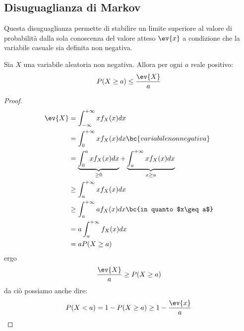 \subsection{Disuguaglianza di Markov}
Questa disuguaglianza permette di stabilire un limite superiore al valore di probabilità dalla sola conoscenza del valore atteso $\ev{x}$ a condizione che la variabile casuale sia definita non negativa.
\begin{teor} \label{teor:markov}
	Sia $X$ una variabile aleatoria non negativa. Allora per ogni $a$ reale positivo:
	\begin{equation*}
		P(X\geq a) \leq \frac{\ev{X}}{a}
	\end{equation*}
\end{teor}
\begin{proof}
	\begin{align*}
		\ev{X} & = \int_{-\infty}^{+\infty} x f_X(x) dx                                      \\
		       & = \int_0^{+\infty} x f_X(x) dx                  \bc{variabile non negativa} \\
		       & = \underbrace{\int_0^a x f_X(x) dx}_{\geq 0} + \underbrace{\int_a^{+\infty} x f_X(x) dx}_{x \geq a} \\
		       & \geq \int_a^{+\infty} x f_X(x) dx                                           \\
		       & \geq \int_a^{+\infty} a f_X(x) dx                  \bc{in quanto $x\geq a$} \\
		       & = a \int_a^{+\infty} f_X(x) dx                                              \\
		       & = a P(X\geq a)
	\end{align*}
	ergo
	\begin{equation*}
		\frac{\ev{X}}{a}\geq P(X\geq a)
	\end{equation*}
	da ciò possiamo anche dire:
	\begin{equation*}
		P(X < a) = 1 - P(X \geq a) \geq 1- \frac{\ev{x}}{a}
		\end{equation*}
\end{proof}



